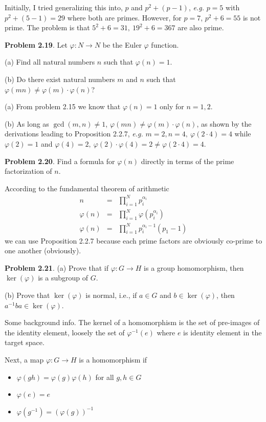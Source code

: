 \documentclass[aps,preprint,preprintnumbers,nofootinbib,showpacs,prd]{revtex4-1}
\newcommand{\eg}{{\it e.g.} }
\newcommand{\bit}{\begin{itemize}}
\newcommand{\eit}{\end{itemize}}
\newcommand{\nbea}{\begin{eqnarray*}}
\newcommand{\neea}{\end{eqnarray*}}
\begin{document}
Initially, I tried generalizing this into, $p$ and $p^2 + (p-1)$, \eg $p=5$ with $p^2 + (5-1) = 29$ where both are primes. However, for $p=7$, $p^2 + 6 = 55$ is not prime. The problem is that $5^2 + 6 = 31, ~19^2 + 6 = 367$ are also prime.

{\bf Problem 2.19}. Let $\varphi : N \to N$ be the Euler $\varphi$ function.

(a) Find all natural numbers $n$ such that $\varphi(n) = 1$.

(b) Do there exist natural numbers $m$ and $n$ such that $\varphi(mn) \neq \varphi(m) \cdot \varphi(n)$?

(a) From problem 2.15 we know that $\varphi(n) = 1$ only for $n=1,2$.

(b) As long as $\gcd(m,n) \neq 1$, $\varphi(mn) \neq \varphi(m) \cdot \varphi(n)$, as shown by the derivations leading to Proposition 2.2.7, \eg $m = 2, n = 4,~\varphi(2 \cdot 4) = 4$ while $\varphi(2)=1$ and $\varphi(4) = 2,~\varphi(2) \cdot \varphi(4) = 2 \neq \varphi(2 \cdot 4) = 4$.

{\bf Problem 2.20}. Find a formula for $\varphi(n)$ directly in terms of the prime factorization of $n$.

According to the fundamental theorem of arithmetic
%
\nbea
n & = & \prod_{i=1}^{N} p_i^{\alpha_i} \\
\varphi(n) & = & \prod_{i=1}^{N} \varphi(p_i^{\alpha_i}) \\
\varphi(n) & = & \prod_{i=1}^{N} p_i^{\alpha_i-1}(p_1 - 1)
\neea
%
we can use Proposition 2.2.7 because each prime factors are obviously co-prime to one another (obviously).

{\bf Problem 2.21}. (a) Prove that if $\varphi : G \to H$ is a group homomorphism, then $\ker(\varphi)$
is a subgroup of $G$.

(b) Prove that $\ker(\varphi)$ is normal, i.e., if $a \in G$ and $b \in \ker(\varphi)$, then $a^{-1} ba \in \ker(\varphi)$.

Some background info. The kernel of a homomorphism is the set of pre-images of the identity element, loosely the set of $\varphi^{-1}(e)$ where $e$ is identity element in the target space.

Next, a map $\varphi : G \to H$ is a homomorphism if
\bit
\item $\varphi(gh) = \varphi(g)\varphi(h)$ for all $g,h \in G$
\item $\varphi(e) = e$
\item $\varphi(g^{-1}) = (\varphi(g))^{-1}$
\eit
\end{document}
